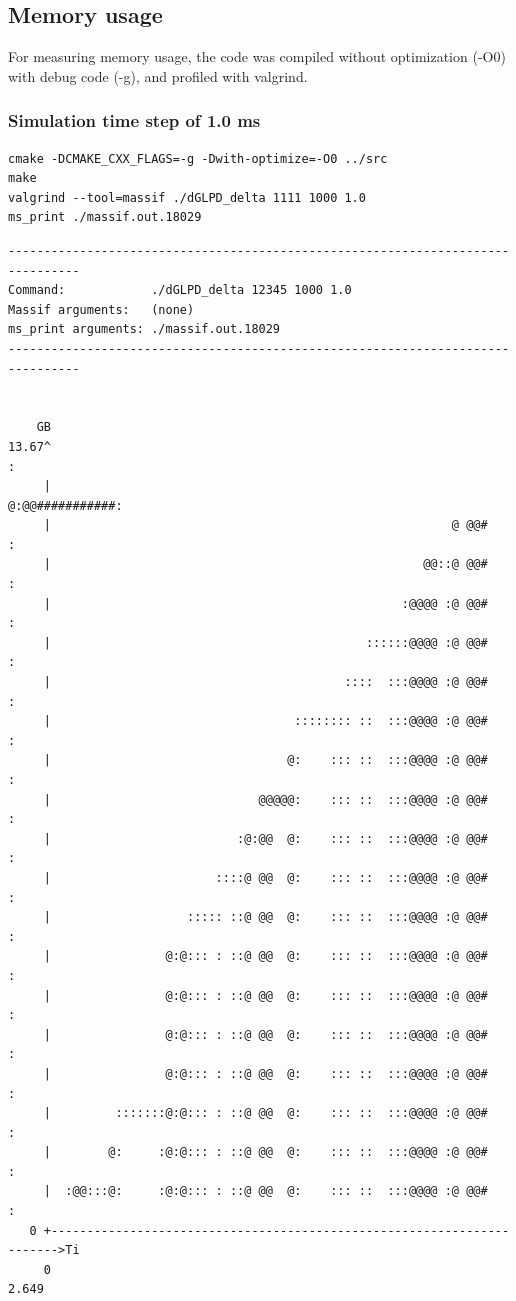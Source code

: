 \documentclass[11pt]{scrartcl}
\begin{document}
\subsection{Memory usage}
\label{sec:org1e9b356}

For measuring memory usage, the code was compiled without optimization (-O0) with debug code (-g), and profiled with valgrind.

\subsubsection{Simulation time step of 1.0 ms}
\label{sec:orgc55b945}

\begin{verbatim}
cmake -DCMAKE_CXX_FLAGS=-g -Dwith-optimize=-O0 ../src
make
valgrind --tool=massif ./dGLPD_delta 1111 1000 1.0
ms_print ./massif.out.18029
\end{verbatim}

\begin{verbatim}
--------------------------------------------------------------------------------
Command:            ./dGLPD_delta 12345 1000 1.0
Massif arguments:   (none)
ms_print arguments: ./massif.out.18029
--------------------------------------------------------------------------------


    GB
13.67^                                                                       :
     |                                                        @:@@###########:
     |                                                        @ @@#          :
     |                                                    @@::@ @@#          :
     |                                                 :@@@@ :@ @@#          :
     |                                            ::::::@@@@ :@ @@#          :
     |                                         ::::  :::@@@@ :@ @@#          :
     |                                  :::::::: ::  :::@@@@ :@ @@#          :
     |                                 @:    ::: ::  :::@@@@ :@ @@#          :
     |                             @@@@@:    ::: ::  :::@@@@ :@ @@#          :
     |                          :@:@@  @:    ::: ::  :::@@@@ :@ @@#          :
     |                       ::::@ @@  @:    ::: ::  :::@@@@ :@ @@#          :
     |                   ::::: ::@ @@  @:    ::: ::  :::@@@@ :@ @@#          :
     |                @:@::: : ::@ @@  @:    ::: ::  :::@@@@ :@ @@#          :
     |                @:@::: : ::@ @@  @:    ::: ::  :::@@@@ :@ @@#          :
     |                @:@::: : ::@ @@  @:    ::: ::  :::@@@@ :@ @@#          :
     |                @:@::: : ::@ @@  @:    ::: ::  :::@@@@ :@ @@#          :
     |         :::::::@:@::: : ::@ @@  @:    ::: ::  :::@@@@ :@ @@#          :
     |        @:     :@:@::: : ::@ @@  @:    ::: ::  :::@@@@ :@ @@#          :
     |  :@@:::@:     :@:@::: : ::@ @@  @:    ::: ::  :::@@@@ :@ @@#          :
   0 +----------------------------------------------------------------------->Ti
     0                                                                   2.649

\end{verbatim}
\end{document}
